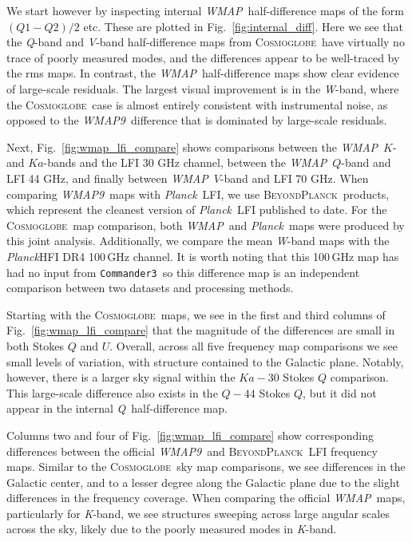 \documentclass[twocolumn]{../../common/aa}
\def\WMAP{\emph{WMAP}}
\def\WMAPnine{\emph{WMAP9}}
\def\Planck{\emph{Planck}}
\def\commanderthree{\texttt{Commander3}}
\newcommand{\BP}{\textsc{BeyondPlanck}}
\newcommand{\cosmoglobe}{\textsc{Cosmoglobe}}
\newcommand{\K}[0]{\textit K}
\newcommand{\Ka}[0]{\textit{Ka}}
\newcommand{\Q}[0]{\textit Q}
\newcommand{\V}[0]{\textit V}
\newcommand{\W}[0]{\textit W}
\begin{document}
We start however by inspecting internal \WMAP\ half-difference maps of the form $(Q1-Q2)/2$ etc. These are plotted in Fig.~\ref{fig:internal_diff}. Here we see that the \Q-band and \V-band half-difference maps from \cosmoglobe\ have virtually no trace of poorly measured modes, and the differences appear to be well-traced by the rms maps. In contrast, the \WMAP\ half-difference maps show clear evidence of large-scale residuals. The largest visual improvement is in the \W-band, where the \cosmoglobe\ case is almost entirely consistent with instrumental noise, as opposed to the \WMAPnine\ difference that is dominated by large-scale residuals.  

Next, Fig.~\ref{fig:wmap_lfi_compare} shows comparisons between the \WMAP\ $K$-
and $Ka$-bands and the LFI 30 GHz channel, between the \WMAP\ $Q$-band and LFI
44 GHz, and finally between \WMAP\ $V$-band and LFI 70 GHz. When comparing
\WMAPnine\ maps with \Planck\ LFI, we use \BP\ products, which represent the
cleanest version of \Planck\ LFI published to date. For the \cosmoglobe\ map
comparison, both \WMAP\ and \Planck\ maps were produced by this joint analysis.
Additionally, we compare the mean \W-band maps with the \Planck HFI DR4
100\,GHz channel. It is worth noting that this 100\,GHz map has had no input
from \commanderthree\ so this difference map is an independent comparison
between two datasets and processing methods.

Starting with the \cosmoglobe\ maps, we see in the first and third columns of
Fig.~\ref{fig:wmap_lfi_compare} that the magnitude of the differences are small
in both Stokes $Q$ and $U$. Overall, across all five frequency map comparisons
we see small levels of variation, with structure contained to the Galactic
plane. Notably, however, there is a larger sky signal within the
$\mathit{Ka}-30$ Stokes $Q$ comparison.
This large-scale difference also exists in the $\mathit Q-44$ Stokes
$Q$, but it did not appear in the internal \Q\ half-difference map.

Columns two and four of Fig.~\ref{fig:wmap_lfi_compare} show corresponding differences
between the official \WMAPnine\ and \BP\ LFI frequency maps. Similar to the
\cosmoglobe\ sky map comparisons, we see differences in the Galactic center,
and to a lesser degree along the Galactic plane due to the slight differences
in the frequency coverage. When comparing the official \WMAP\ maps,
particularly for \K-band, we see structures sweeping across large angular
scales across the sky, likely due to the poorly measured modes in \K-band. 
\end{document}
